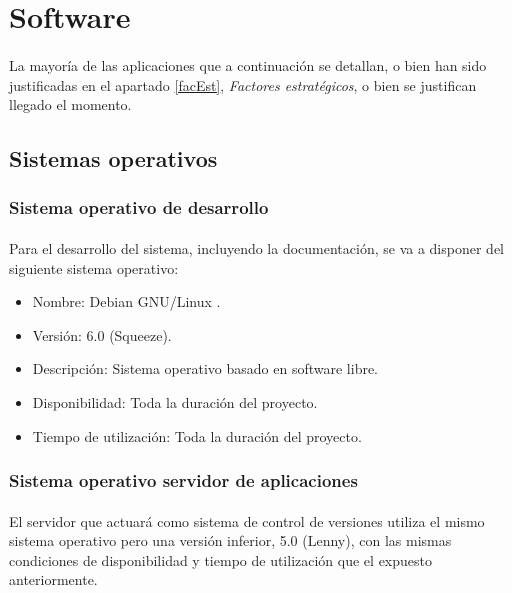 \section{Software}

   \paragraph{}La mayoría de las aplicaciones que a continuación se detallan,
   o bien han sido justificadas en el apartado \ref{facEst}, \textit{Factores
   estratégicos}, o bien se justifican llegado el momento.

   \subsection{Sistemas operativos}

      \subsubsection{Sistema operativo de desarrollo}

      \paragraph{}Para el desarrollo del sistema, incluyendo la documentación,
      se va a disponer del siguiente sistema operativo:

      \begin{itemize}
         \item Nombre: Debian GNU/Linux \cite{debian}.
         \item Versión: 6.0 (Squeeze).
         \item Descripción: Sistema operativo basado en software libre.
         \item Disponibilidad: Toda la duración del proyecto.
         \item Tiempo de utilización: Toda la duración del proyecto.
      \end{itemize}

      \subsubsection{Sistema operativo servidor de aplicaciones}

      \paragraph{}El servidor que actuará como sistema de control de versiones
      utiliza el mismo sistema operativo pero una versión inferior, 5.0 (Lenny),
      con las mismas condiciones de disponibilidad y tiempo de utilización que
      el expuesto anteriormente.

